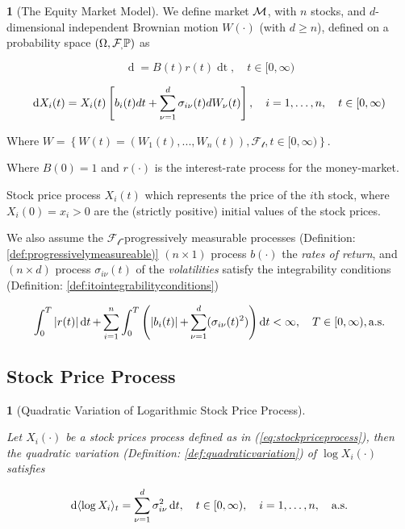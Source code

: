 \documentclass[british]{amsart}
\numberwithin{equation}{section}
\numberwithin{figure}{section}
\theoremstyle{plain}
\theoremstyle{definition}
\newtheorem{defn}[thm]{\protect\definitionname}
\theoremstyle{plain}
\theoremstyle{plain}
\theoremstyle{plain}
\newtheorem{prop}[thm]{\protect\propositionname}
\theoremstyle{remark}
\theoremstyle{plain}
\providecommand{\definitionname}{Definition}
\providecommand{\propositionname}{Proposition}
\renewcommand{\d}[1]{\mathop{\mathrm{d}{#1}}}
\newcommand{\ranget}{t\in[0,\infty)}
\newcommand{\filtration}[1]{\mathcal{F_{#1}}}
\newcommand{\almostsurely}{\text{a.s.}}
\begin{document}
\begin{defn} [The Equity Market Model]
	\label{def:marketmodel}
 	\cite{fernholz2009} 
	We define market $\mathcal{M}$, with $n$ stocks, and $d$-dimensional independent Brownian 
	motion $W(\cdot)$ (with $d \ge n$), defined on a probability space 
	$\probabilityspace$ as

	\begin{equation*}
		\label{eq:equitymarketmodelriskfree}
		\d{B(t)} = B(t)r(t)\d{t},
		\quad \ranget
	\end{equation*}

	\begin{equation}
		\label{eq:stockpriceprocess}
		\d{X_{i}(t)} = X_{i}(t) 
				\left[
					b_{i}(t)dt + 
					\sum_{\nu=1}^{d} \sigma_{i\nu}(t) dW_{\nu}(t)
				\right],
				\quad \rangei,
				\quad \ranget
	\end{equation}

	Where $W = \left\{ W(t)=(W_{1}(t),...,W_{n}(t)),\filtration{t},\ranget \right\}$.

	Where $B(0)=1$ and $r(\cdot)$ is the interest-rate process for the money-market.

	Stock price process $X_{i}(t)$ which represents the price of the $i$th stock, where 
	$X_{i}(0) = x_{i} > 0$ are the (strictly positive) initial values of the stock prices.

	We also assume the $\filtration{t}$-progressively measurable processes (Definition: 
	\ref{def:progressivelymeasureable)} $(n \times 1)$ process $b(\cdot)$ the 
	\textit{rates of return}, and $(n \times d)$ process $\sigma_{i\nu}(t)$ of the 
	\textit{volatilities} satisfy the integrability conditions (Definition: 
	\ref{def:itointegrabilityconditions})

	\begin{equation*}
		\int_{0}^{T} 
		\abs{r(t)} 
		\d{t} +
		\sum_{i=1}^{n} \int_{0}^{T} 
			\left( 
					\abs{b_{i}(t)} +
					\sum_{\nu=1}^{d} ( \sigma_{i\nu}(t)^2  ) 
					\right) \d{t} < \infty,
		\quad
		T \in [0, \infty),
		\almostsurely
	 \end{equation*}

\end{defn}

\subsection{Stock Price Process}

\begin{prop} [Quadratic Variation of Logarithmic Stock Price Process]
	\label{prop:crossvarlogX}

	Let $X_{i}(\cdot)$ be a stock prices process defined as in (\ref{eq:stockpriceprocess}), 
	then the quadratic variation (Definition: \ref{def:quadraticvariation}) of
	$\log{X_{i}(\cdot)}$ satisfies

	\begin{equation}
		\d{\langle \log{X_{i}} \rangle_{t}} = \sum_{\nu=1}^{d} \sigma_{i\nu}^2\d{t},
		\quad \ranget,
		\quad \rangei,
		\quad \almostsurely
	\end{equation}

\end{prop}
\end{document}
